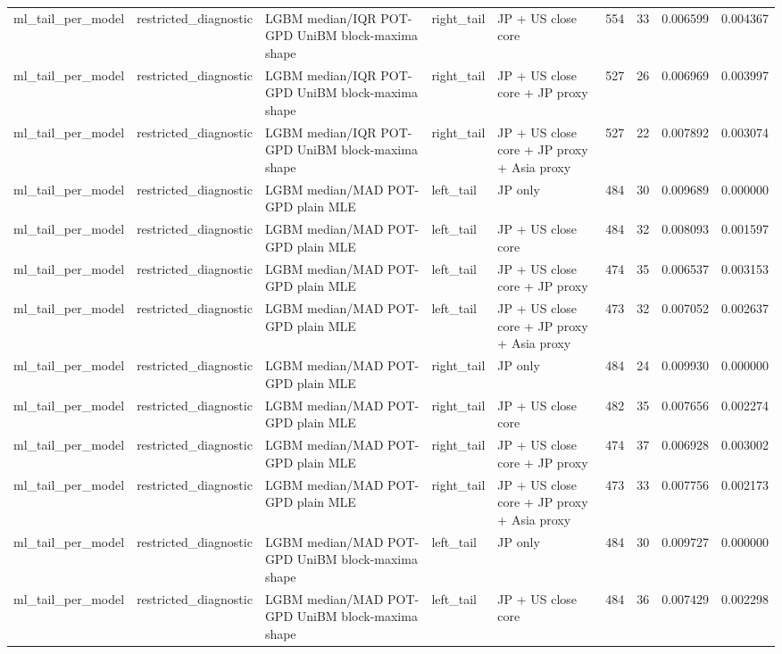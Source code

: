 \begin{tabular}{lllllrrrr}
ml\_tail\_per\_model & restricted\_diagnostic & LGBM median/IQR POT-GPD UniBM block-maxima shape & right\_tail & JP + US close core & 554 & 33 & 0.006599 & 0.004367 \\
ml\_tail\_per\_model & restricted\_diagnostic & LGBM median/IQR POT-GPD UniBM block-maxima shape & right\_tail & JP + US close core + JP proxy & 527 & 26 & 0.006969 & 0.003997 \\
ml\_tail\_per\_model & restricted\_diagnostic & LGBM median/IQR POT-GPD UniBM block-maxima shape & right\_tail & JP + US close core + JP proxy + Asia proxy & 527 & 22 & 0.007892 & 0.003074 \\
ml\_tail\_per\_model & restricted\_diagnostic & LGBM median/MAD POT-GPD plain MLE & left\_tail & JP only & 484 & 30 & 0.009689 & 0.000000 \\
ml\_tail\_per\_model & restricted\_diagnostic & LGBM median/MAD POT-GPD plain MLE & left\_tail & JP + US close core & 484 & 32 & 0.008093 & 0.001597 \\
ml\_tail\_per\_model & restricted\_diagnostic & LGBM median/MAD POT-GPD plain MLE & left\_tail & JP + US close core + JP proxy & 474 & 35 & 0.006537 & 0.003153 \\
ml\_tail\_per\_model & restricted\_diagnostic & LGBM median/MAD POT-GPD plain MLE & left\_tail & JP + US close core + JP proxy + Asia proxy & 473 & 32 & 0.007052 & 0.002637 \\
ml\_tail\_per\_model & restricted\_diagnostic & LGBM median/MAD POT-GPD plain MLE & right\_tail & JP only & 484 & 24 & 0.009930 & 0.000000 \\
ml\_tail\_per\_model & restricted\_diagnostic & LGBM median/MAD POT-GPD plain MLE & right\_tail & JP + US close core & 482 & 35 & 0.007656 & 0.002274 \\
ml\_tail\_per\_model & restricted\_diagnostic & LGBM median/MAD POT-GPD plain MLE & right\_tail & JP + US close core + JP proxy & 474 & 37 & 0.006928 & 0.003002 \\
ml\_tail\_per\_model & restricted\_diagnostic & LGBM median/MAD POT-GPD plain MLE & right\_tail & JP + US close core + JP proxy + Asia proxy & 473 & 33 & 0.007756 & 0.002173 \\
ml\_tail\_per\_model & restricted\_diagnostic & LGBM median/MAD POT-GPD UniBM block-maxima shape & left\_tail & JP only & 484 & 30 & 0.009727 & 0.000000 \\
ml\_tail\_per\_model & restricted\_diagnostic & LGBM median/MAD POT-GPD UniBM block-maxima shape & left\_tail & JP + US close core & 484 & 36 & 0.007429 & 0.002298 \\

\end{tabular}
